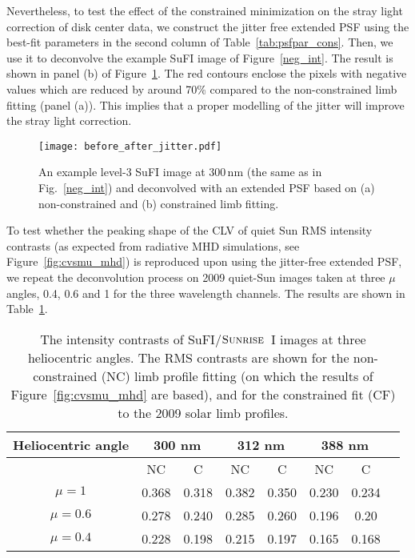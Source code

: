 \documentclass[goettingen, gauss, print]{thesis}
\begin{document}
Nevertheless, to test the effect of the constrained minimization on the stray light correction of disk center data, we construct the jitter free extended PSF using the best-fit parameters in the second column of Table~\ref{tab:psfpar_cons}. Then, we use it to deconvolve the example SuFI image of Figure~\ref{neg_int}. The result is shown in panel (b) of Figure~\ref{b_a_jitter}. The red contours enclose the pixels with negative values which are reduced by around 70\% compared to the non-constrained limb fitting (panel (a)). This implies that a proper modelling of the jitter will improve the stray light correction. 

\begin{figure}
\center
\texttt{[image: before\_after\_jitter.pdf]}
\caption{An example level-3 SuFI image at 300\,nm (the same as in Fig.~\ref{neg_int}) and deconvolved with an extended PSF based on (a) non-constrained and (b) constrained limb fitting.}
\label{b_a_jitter}
\end{figure}

To test whether the peaking shape of the CLV of quiet Sun RMS intensity contrasts (as expected from radiative MHD simulations, see Figure~\ref{fig:cvsmu_mhd}) is reproduced upon using the jitter-free extended PSF, we repeat the deconvolution process on 2009 quiet-Sun images taken at three $\mu$ angles, 0.4, 0.6 and 1 for the three wavelength channels. The results are shown in Table~\ref{tab:RMS_cons}.

\begin{table}
\caption{The intensity contrasts of SuFI/$\textsc{Sunrise}$~I images at three heliocentric angles. The RMS contrasts are shown for the non-constrained (NC) limb profile fitting (on which the results of Figure~\ref{fig:cvsmu_mhd} are based), and for the constrained fit (CF) to the 2009 solar limb profiles.}
\label{tab:RMS_cons}
\centering
\begin{tabular}{cccccccc}

\hline
\hline
Heliocentric angle  & \multicolumn{2}{c}{300 nm}  & \multicolumn{2}{c}{312 nm}  & \multicolumn{2}{c}{388 nm}  \\
\hline
\hline
& NC&C &NC&C&NC&C\\
\hline
 $\mu = 1$ & 0.368& 0.318& 0.382&0.350 &0.230&0.234   \\
 $\mu=0.6$&  0.278&0.240 &0.285&0.260& 0.196&0.20\\
 $\mu=0.4$&  0.228&0.198&0.215&0.197&0.165&0.168\\
 
\hline

\end{tabular}
\end{table}
\end{document}
